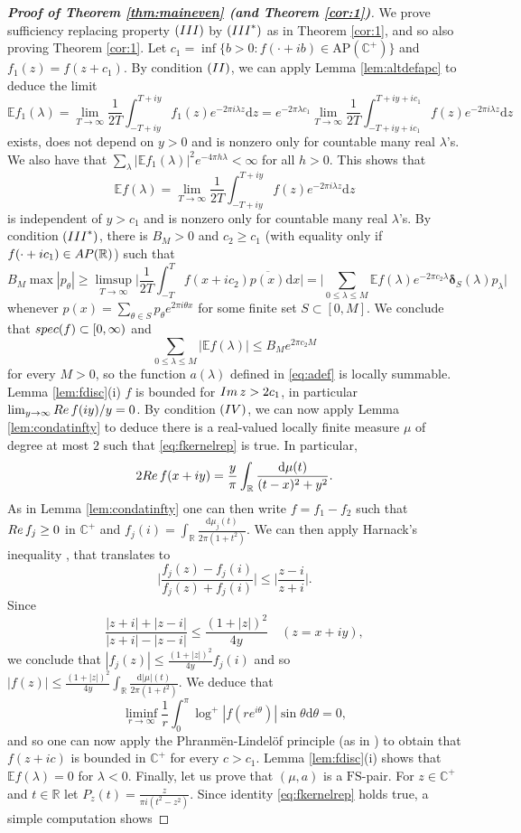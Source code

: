 \documentclass[a4paper,reqno,12pt]{amsart}
\newcommand{\E}{\mathcal{E}}
\renewcommand{\H}{\mathbb{C}^+}
\renewcommand{\r}{\mathbb{R}}
\newcommand{\im}{{\rm Im}\,}
\newcommand{\re}{{\rm Re}\,}
\newcommand{\bo}{\boldsymbol}
\newcommand{\la}{\lambda}
\renewcommand{\d}{\mathrm{d}}
\newcommand{\1}{{\bf 1}}
\newcommand{\apc}{\mathrm{AP}(\H)}
\newcommand{\fs}{\mathrm{FS}}
\renewcommand{\E}{\mathbb{E}}
\newcommand{\ov}[1]{\overline{#1}}
\newcommand{\apr}{{\rm AP}(\r)}
\renewcommand{\1}{{\bo 1}}
\newcommand{\del}{{\bo \delta}}
\renewcommand{\Re}{{\rm Re}\,}
\newcommand{\spec}{{\rm spec}}
\begin{document}
\begin{proof}[\bf Proof of Theorem \ref{thm:maineven} (and Theorem \ref{cor:1})]
  We prove sufficiency replacing property $({\rm III})$ by $({\rm III}^*)$ as in Theorem \ref{cor:1}, and so also proving Theorem \ref{cor:1}. Let $c_1=\inf\{b>0 : f(\cdot + ib)\in \apc\}$ and $f_1(z)=f(z+c_1)$. By condition $({\rm II})$, we can apply Lemma \ref{lem:altdefapc} to deduce the limit
$$
\E f_1(\la)=\lim_{T\to\infty} \frac{1}{2T}\int_{-T+iy}^{T+iy} f_1(z)e^{-2\pi i \la z}\d z =e^{-2\pi \la c_1} \lim_{T\to\infty} \frac{1}{2T}\int_{-T+iy+ic_1}^{T+iy+ic_1} f(z)e^{-2\pi i \la z}\d z 
$$
exists, does not depend on $y>0$ and is nonzero only for countable many real $\la$'s. We also have that $\sum_{\la} |\E f_1(\la)|^2e^{-4\pi h \la} < \infty$ for all $h>0$. This shows that 
$$
\E f(\la) = \lim_{T\to\infty} \frac{1}{2T}\int_{-T+iy}^{T+iy} f(z)e^{-2\pi i \la z}\d z
$$
is independent of $y>c_1$ and is nonzero only for countable many real $\la$'s. By condition $({\rm III}^*)$, there is $B_M>0$ and $c_2\geq c_1$ (with equality only if $f(\cdot+ic_1)\in \apr$) such that
$$
B_M \max |p_\theta| \geq \limsup_{T\to\infty}\bigg| \frac{1}{2T}\int_{-T}^T f(x+ic_2)\ov{p(x)}\d x\bigg| = \bigg| \sum_{0\leq \la\leq M} \E f(\la)e^{-2\pi c_2\la} \del_S(\la) p_\la \bigg|
$$
whenever $p(x)=\sum_{\theta \in S} p_\theta e^{2\pi i \theta x}$ for some finite set $S\subset [0,M]$. We conclude that 
$\spec(f)\subset [0,\infty)$ and
$$
\sum_{0\leq \la\leq M} |\E f(\la)| \leq B_M e^{2\pi c_2 M}
$$
for every $M>0$, so the function $a(\la)$ defined in \eqref{eq:adef} is locally summable. Lemma \ref{lem:fdisc}(i) $f$ is bounded for $\im z>2c_1$, in particular $\lim_{y\to\infty} \re f(iy)/y=0$. By condition $({\rm IV})$, we can now apply Lemma \ref{lem:condatinfty} to deduce there is a real-valued locally finite measure $\mu$ of degree at most $2$ such that \eqref{eq:fkernelrep} is true. In particular,
$$
2\Re f(x+iy) = \frac{y}{\pi }\int_\r  \frac{\d \mu(t)}{(t-x)^2+y^2}.
$$
As in Lemma \ref{lem:condatinfty} one can then write $f=f_1-f_2$ such that $\Re f_j \geq 0$ in $\H$ and $f_j(i)=\int_{\r} \frac{\d \mu_j(t)}{2\pi(1+t^2)}$. We can then apply Harnack's inequality \cite[p. 136]{Be}, that translates to
$$
\bigg|\frac{f_j(z)-f_j(i)}{f_j(z)+f_j(i)}\bigg| \leq \bigg|\frac{z-i}{z+i}\bigg|.
$$
Since 
$$
\frac{|z+i|+|z-i|}{|z+i|-|z-i|}\leq \frac{(1+|z|)^2}{4y} \quad (z=x+iy),
$$
we conclude that $|f_j(z)| \leq  \frac{(1+|z|)^2}{4y}f_j(i)$ and so $|f(z)|\leq  \frac{(1+|z|)^2}{4y}\int_{\r} \frac{\d |\mu|(t)}{2\pi(1+t^2)}$. We deduce that
$$
\liminf_{r\to\infty}\frac{1}{r} \int_0^\pi \log^+|f(re^{i\theta})|\sin \theta \d \theta = 0,
$$
and so one can now apply the Phranm\"en-Lindel\"of principle (as in \cite[Thm. 1]{dB}) to obtain that $f(z+ic)$ is bounded in $\H$ for every $c>c_1$. Lemma \ref{lem:fdisc}(i) shows that $\E f(\la)=0$ for $\la<0$. Finally, let us prove that $(\mu,a)$ is a $\fs$-pair. For $z\in \H$ and $t\in \r$ let $P_z(t)=\frac{z}{\pi i(t^2-z^2)}$. Since identity \eqref{eq:fkernelrep} holds true, a simple computation shows

\end{proof}
\end{document}
